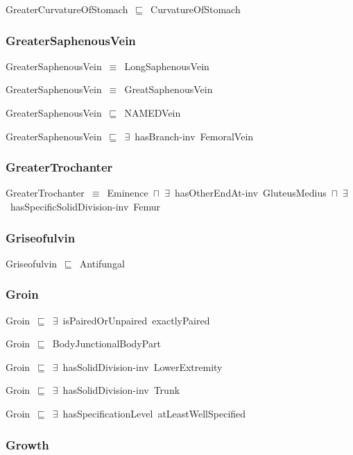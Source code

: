 \documentclass{article}
\begin{document}
GreaterCurvatureOfStomach~\ensuremath{\sqsubseteq}~CurvatureOfStomach~

\subsubsection*{GreaterSaphenousVein}

GreaterSaphenousVein~\ensuremath{\equiv}~LongSaphenousVein

GreaterSaphenousVein~\ensuremath{\equiv}~GreatSaphenousVein

GreaterSaphenousVein~\ensuremath{\sqsubseteq}~NAMEDVein~

GreaterSaphenousVein~\ensuremath{\sqsubseteq}~\ensuremath{\exists}~hasBranch-inv~FemoralVein~

\subsubsection*{GreaterTrochanter}

GreaterTrochanter~\ensuremath{\equiv}~Eminence~\ensuremath{\sqcap}~\ensuremath{\exists}~hasOtherEndAt-inv~GluteusMedius~\ensuremath{\sqcap}~\ensuremath{\exists}~hasSpecificSolidDivision-inv~Femur

\subsubsection*{Griseofulvin}

Griseofulvin~\ensuremath{\sqsubseteq}~Antifungal~

\subsubsection*{Groin}

Groin~\ensuremath{\sqsubseteq}~\ensuremath{\exists}~isPairedOrUnpaired~exactlyPaired~

Groin~\ensuremath{\sqsubseteq}~BodyJunctionalBodyPart~

Groin~\ensuremath{\sqsubseteq}~\ensuremath{\exists}~hasSolidDivision-inv~LowerExtremity~

Groin~\ensuremath{\sqsubseteq}~\ensuremath{\exists}~hasSolidDivision-inv~Trunk~

Groin~\ensuremath{\sqsubseteq}~\ensuremath{\exists}~hasSpecificationLevel~atLeastWellSpecified~

\subsubsection*{Growth}
\end{document}
